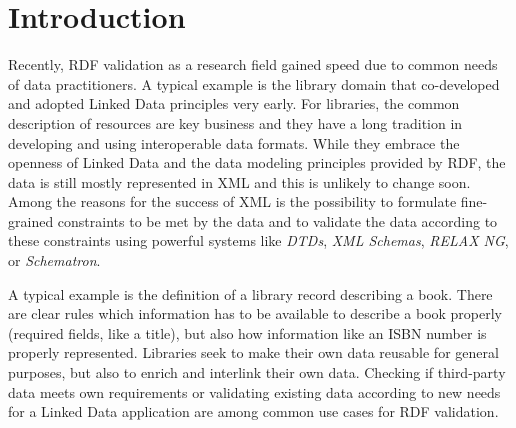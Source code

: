 \documentclass{acm_proc_article-sp}
\begin{document}
  

\section{Introduction}
\label{introduction}

Recently, RDF validation as a research field gained speed due to common needs of data practitioners. A typical example is the library domain that co-developed and adopted Linked Data principles very early. For libraries, the common description of resources are key business and they have a long tradition in developing and using interoperable data formats. While they embrace the openness of Linked Data and the data modeling principles provided by RDF, the data is still mostly represented in XML and this is unlikely to change soon. 
Among the reasons for the success of XML is the possibility to formulate fine-grained constraints to be met by the data and to validate the data according to these constraints using powerful systems like \emph{DTDs}, \emph{XML Schemas}, \emph{RELAX NG}, or \emph{Schematron}.

A typical example is the definition of a library record describing a book. There are clear rules which information has to be available to describe a book properly (required fields, like a title), but also how information like an ISBN number is properly represented. Libraries seek to make their own data reusable for general purposes, but also to enrich and interlink their own data. Checking if third-party data meets own requirements or validating existing data according to new needs for a Linked Data application are among common use cases for RDF validation.
\end{document}
